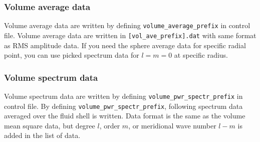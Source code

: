 \subsubsection{Volume average data}
Volume average data are written by defining {\tt volume\_average\_prefix} in control file. Volume average data are written in \verb|[vol_ave_prefix].dat| with same format as RMS amplitude data. If you need the sphere average data for specific radial point, you can use picked spectrum data for $l = m = 0$ at specific radius.

\subsubsection{Volume spectrum data}
Volume spectrum data are written by defining {\tt volume\_pwr\_spectr\_prefix} in control file. By defining {\tt volume\_pwr\_spectr\_prefix}, following spectrum data averaged over the fluid shell is written. Data format is the same as the volume mean square data, but degree $l$, order $m$, or meridional wave number $l-m$ is added in the list of data. \\
%
